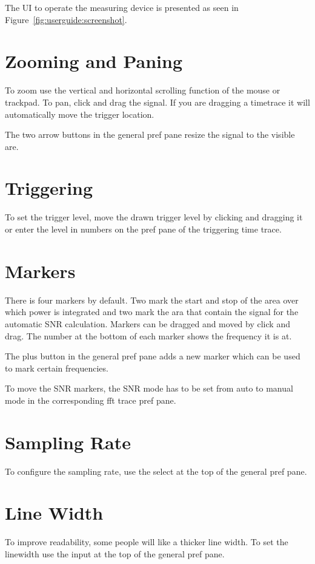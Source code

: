 The UI to operate the measuring device is presented as seen in Figure~\ref{fig:userguide:screenshot}.

\section*{Zooming and Paning}

To zoom use the vertical and horizontal scrolling function of the mouse or trackpad.
To pan, click and drag the signal. If you are dragging a timetrace it will automatically move the trigger location.

The two arrow buttons in the general pref pane resize the signal to the visible are.

\section*{Triggering}

To set the trigger level, move the drawn trigger level by clicking and dragging it or enter the level in numbers on the pref pane of the triggering time trace.

\section*{Markers}

There is four markers by default. Two mark the start and stop of the area over which power is integrated and two mark the ara that contain the signal for the automatic SNR calculation.
Markers can be dragged and moved by click and drag. The number at the bottom of each marker shows the frequency it is at.

The plus button in the general pref pane adds a new marker which can be used to mark certain frequencies.

To move the SNR markers, the SNR mode has to be set from auto to manual mode in the corresponding fft trace pref pane.

\section*{Sampling Rate}
To configure the sampling rate, use the select at the top of the general pref pane.

\section*{Line Width}
To improve readability, some people will like a thicker line width. To set the linewidth use the input at the top of the general pref pane.

